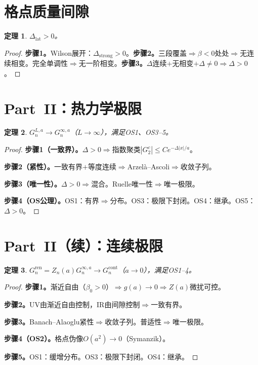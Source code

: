 \documentclass[12pt,a4paper]{article}
\theoremstyle{plain}
\newtheorem{theorem}{定理}[section]
\theoremstyle{definition}
\theoremstyle{remark}
\begin{document}
\section{格点质量间隙}\label{sec:latgap}
\begin{theorem}\label{thm:latgap}
$\Delta_{\mathrm{lat}}>0$。
\end{theorem}
\begin{proof}
\textbf{步骤1。}Wilson展开：$\Delta_{\mathrm{strong}}>0$。\textbf{步骤2。}三段覆盖$\Rightarrow\beta<0$处处$\Rightarrow$无连续相变。完全单调性$\Rightarrow$无一阶相变。\textbf{步骤3。}$\Delta$连续$+$无相变$+\Delta\neq 0\Rightarrow\Delta>0$。
\end{proof}
\section{Part~II：热力学极限}\label{sec:thermo}

\begin{theorem}\label{thm:thermo}
$G_n^{L,a}\to G_n^{\infty,a}$（$L\to\infty$），满足OS1、OS3--5。
\end{theorem}

\begin{proof}
\textbf{步骤1（一致界）。}$\Delta>0\Rightarrow$指数聚类$|G_2^c|\leq Ce^{-\Delta|x|/a}$。

\textbf{步骤2（紧性）。}一致有界$+$等度连续$\Rightarrow$Arzel\`a--Ascoli$\Rightarrow$收敛子列。

\textbf{步骤3（唯一性）。}$\Delta>0\Rightarrow$混合。Ruelle唯一性\cite{Ruelle1969}$\Rightarrow$唯一极限。

\textbf{步骤4（OS公理）。}OS1：有界$\Rightarrow$分布。OS3：极限下封闭\cite{OsterwalderSeiler1978}。OS4：继承。OS5：$\Delta>0$。
\end{proof}

\section{Part~II（续）：连续极限}\label{sec:contlim}

\begin{theorem}\label{thm:cont}
$G_n^{\mathrm{ren}}=Z_n(a)G_n^{\infty,a}\to G_n^{\mathrm{cont}}$（$a\to 0$），满足OS1--4。
\end{theorem}

\begin{proof}
\textbf{步骤1。}渐近自由（$\beta_0>0$）$\Rightarrow g(a)\to 0\Rightarrow Z(a)$微扰可控。

\textbf{步骤2。}UV由渐近自由控制，IR由间隙控制$\Rightarrow$一致有界。

\textbf{步骤3。}Banach--Alaoglu紧性$\Rightarrow$收敛子列。普适性$\Rightarrow$唯一极限。

\textbf{步骤4（OS2）。}格点伪像$O(a^2)\to 0$（Symanzik\cite{Symanzik1983}）。

\textbf{步骤5。}OS1：缓增分布。OS3：极限下封闭。OS4：继承。
\end{proof}
\end{document}
